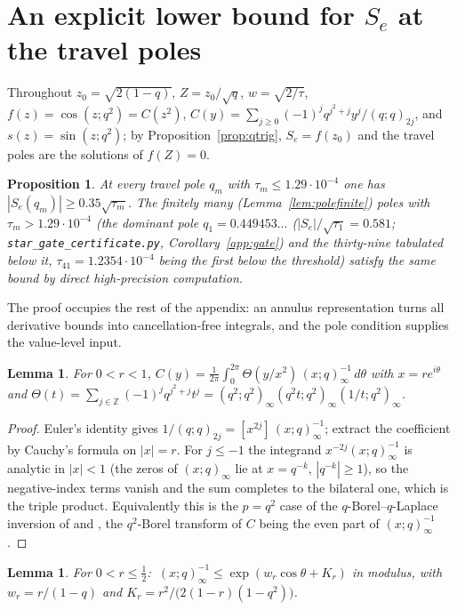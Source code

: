 \documentclass[11pt]{article}
\theoremstyle{plain}
\newtheorem{lemma}[theorem]{Lemma}
\newtheorem{proposition}[theorem]{Proposition}
\theoremstyle{definition}
\theoremstyle{remark}
\newcommand{\Z}{\mathbb{Z}}
\begin{document}
\appendix
\section{An explicit lower bound for $S_e$ at the travel poles}\label{app:annulus}

Throughout $z_0=\sqrt{2(1-q)}$, $Z=z_0/\sqrt q$, $w=\sqrt{2/\tau}$, $f(z)=\cos(z;q^2)=C(z^2)$,
$C(y)=\sum_{j\ge0}(-1)^jq^{j^2+j}y^j/(q;q)_{2j}$, and $s(z)=\sin(z;q^2)$; by
Proposition~\ref{prop:qtrig}, $S_e=f(z_0)$ and the travel poles are the solutions of $f(Z)=0$.

\begin{proposition}\label{prop:selower}
At every travel pole $q_m$ with $\tau_m\le1.29\cdot10^{-4}$ one has
$|S_e(q_m)|\ge0.35\sqrt{\tau_m}$. The finitely many (Lemma~\ref{lem:polefinite}) poles with
$\tau_m>1.29\cdot10^{-4}$ (the
dominant pole $q_1=0.449453\ldots$ ($|S_e|/\sqrt{\tau_1}=0.581$;
\texttt{star\_gate\_certificate.py}, Corollary~\ref{app:gate}) and the thirty-nine tabulated below
it, $\tau_{41}=1.2354\cdot10^{-4}$ being the first below the threshold) satisfy the same bound
by direct high-precision computation.
\end{proposition}

The proof occupies the rest of the appendix: an annulus representation turns all derivative bounds
into cancellation-free integrals, and the pole condition supplies the value-level input.

\begin{lemma}\label{app:rep}
For $0<r<1$,
$C(y)=\frac1{2\pi}\int_0^{2\pi}\Theta(y/x^2)\,(x;q)_\infty^{-1}\,d\theta$ with $x=re^{i\theta}$ and
$\Theta(t)=\sum_{j\in\Z}(-1)^jq^{j^2+j}t^j=(q^2;q^2)_\infty(q^2t;q^2)_\infty(1/t;q^2)_\infty$.
\end{lemma}

\begin{proof}
Euler's identity gives $1/(q;q)_{2j}=[x^{2j}]\,(x;q)_\infty^{-1}$; extract the coefficient by
Cauchy's formula on $|x|=r$. For $j\le-1$ the integrand $x^{-2j}(x;q)_\infty^{-1}$ is analytic in
$|x|<1$ (the zeros of $(x;q)_\infty$ lie at $x=q^{-k}$, $|q^{-k}|\ge1$), so the negative-index terms
vanish and the sum completes to the bilateral one, which is the triple product. Equivalently this is
the $p=q^2$ case of the $q$-Borel--$q$-Laplace inversion of \cite{Zhang2000} and
\cite[Lemma~1]{Morita2011}, the $q^2$-Borel transform of $C$ being the even part of
$(x;q)_\infty^{-1}$.
\end{proof}

\begin{lemma}\label{app:euler}
For $0<r\le\tfrac12$: $\ (x;q)_\infty^{-1}\le\exp(w_r\cos\theta+K_r)$ in modulus, with
$w_r=r/(1-q)$ and $K_r=r^2/\bigl(2(1-r)(1-q^2)\bigr)$.
\end{lemma}
\end{document}
